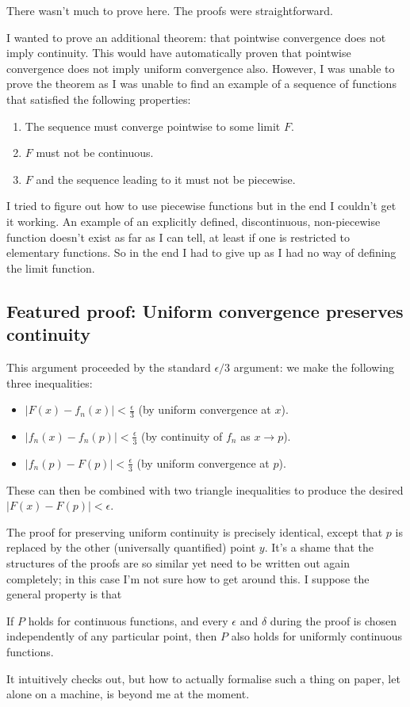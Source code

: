 \documentclass[a4paper, twoside, 11pt]{article}
\theoremstyle{definition}
\theoremstyle{plain}
\theoremstyle{remark}
\begin{document}
There wasn't much to prove here. The proofs were straightforward.

I wanted to prove an additional theorem: that pointwise convergence does not imply continuity. This would have automatically proven that pointwise convergence does not imply uniform convergence also. However, I was unable to prove the theorem as I was unable to find an example of a sequence of functions that satisfied the following properties:

\begin{enumerate}
    \item The sequence must converge pointwise to some limit $F$.
    \item $F$ must not be continuous.
    \item $F$ and the sequence leading to it must not be piecewise.
\end{enumerate}

I tried to figure out how to use piecewise functions but in the end I couldn't get it working. An example of an explicitly defined, discontinuous, non-piecewise function doesn't exist as far as I can tell, at least if one is restricted to elementary functions. So in the end I had to give up as I had no way of defining the limit function.

\subsection{Featured proof: Uniform convergence preserves continuity}

This argument proceeded by the standard $\epsilon/3$ argument: we make the following three inequalities:

\begin{itemize}
    \item $|F(x) - f_{n}(x)| < \frac{\epsilon}{3}$ (by uniform convergence at $x$).
    \item $|f_{n}(x) - f_{n}(p)| < \frac{\epsilon}{3}$ (by continuity of $f_{n}$ as $x \rightarrow p$).
    \item $|f_{n}(p) - F(p)| < \frac{\epsilon}{3}$ (by uniform convergence at $p$).
\end{itemize}

These can then be combined with two triangle inequalities to produce the desired $|F(x) - F(p)| < \epsilon$.

The proof for preserving uniform continuity is precisely identical, except that $p$ is replaced by the other (universally quantified) point $y$. It's a shame that the structures of the proofs are so similar yet need to be written out again completely; in this case I'm not sure how to get around this. I suppose the general property is that

\begin{center}
If $P$ holds for continuous functions, and every $\epsilon$ and $\delta$ during the proof is chosen independently of any particular point, then $P$ also holds for uniformly continuous functions.
\end{center}

It intuitively checks out, but how to actually formalise such a thing on paper, let alone on a machine, is beyond me at the moment.
\end{document}
